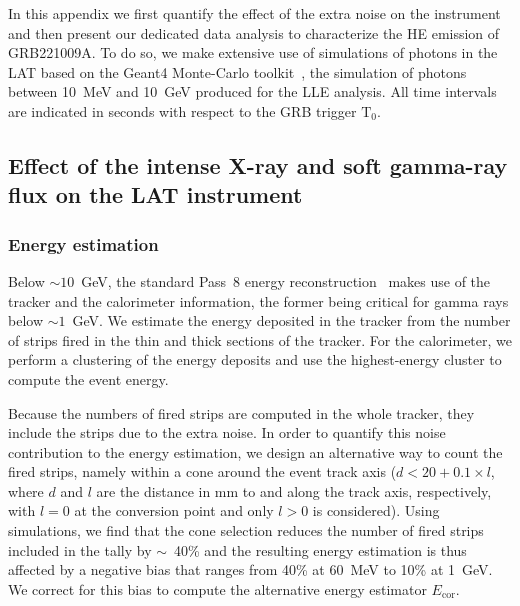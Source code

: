 \documentclass[preprint]{aastex631}
\begin{document}

In this appendix we first quantify the effect of the extra noise on the instrument and then present our dedicated data analysis to characterize the HE emission of GRB221009A. To do so, we make extensive use of simulations of photons in the LAT based on the Geant4 Monte-Carlo toolkit~\citep{AGOSTINELLI2003250,1610988},  the simulation of photons between 10~MeV and 10~GeV produced for the LLE analysis.
All time intervals are indicated in seconds with respect to the GRB trigger $\mathrm{T}_0$.

\subsection{Effect of the intense X-ray and soft gamma-ray flux on the LAT instrument}

\subsubsection{Energy estimation}
\label{sec:energy_estimation}

Below $\sim10$~GeV, the standard Pass~8 energy reconstruction~\citep{2013arXiv1303.3514A} makes use of the tracker and the calorimeter information, the former being critical for gamma rays below $\sim1$~GeV. We estimate the energy deposited in the tracker from the number of strips fired in the thin and thick sections of the tracker. For the calorimeter, we perform a clustering of the energy deposits and use the highest-energy cluster to compute the event energy.

Because the numbers of fired strips are computed in the whole tracker, they include the strips due to the extra noise. In order to quantify this noise contribution to the energy estimation, we design an alternative way to count the fired strips, namely within a cone around the event track axis ($d<20+0.1 \times l$, where $d$ and $l$ are the distance in mm to and along the track axis, respectively, with $l=0$ at the conversion point and only $l>0$ is considered). Using simulations, we find that the cone selection reduces the number of fired strips included in the tally by $\sim$~40\% and the resulting energy estimation is thus affected by a negative bias that ranges from 40\% at 60~MeV to 10\% at 1~GeV. We correct for this bias to compute the alternative energy estimator $E_\mathrm{cor}$.
\end{document}
